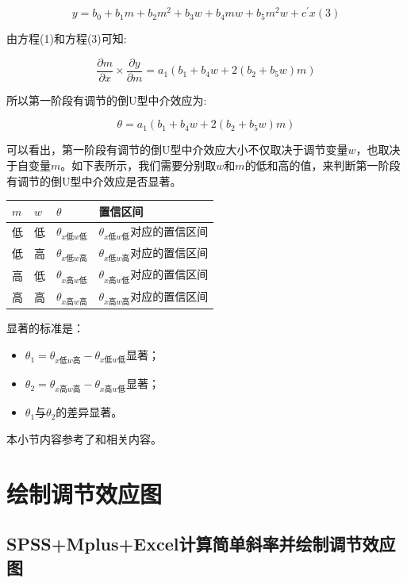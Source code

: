\documentclass[
]{book}
\begin{document}
\[
y=b_{0}+b_{1}m+b_{2}m^{2}+b_{3}w+b_{4}mw+b_{5}m^{2}w+c^{'}x(3)
\]

由方程(1)和方程(3)可知:

\[
\frac{\partial m}{\partial x}{\times}\frac{\partial y}{\partial m}=a_{1}(b_{1}+b_{4}w+2(b_{2}+b_{5}w)m)
\]

所以第一阶段有调节的倒U型中介效应为:

\[
\theta=a_{1}(b_{1}+b_{4}w+2(b_{2}+b_{5}w)m)
\]

可以看出，第一阶段有调节的倒U型中介效应大小不仅取决于调节变量\(w\)，也取决于自变量\(m\)。如下表所示，我们需要分别取\(w\)和\(m\)的低和高的值，来判断第一阶段有调节的倒U型中介效应是否显著。

\begin{longtable}[]{@{}llll@{}}
\toprule
\(m\) & \(w\) & \(\theta\) & 置信区间\tabularnewline
\midrule
\endhead
低 & 低 & \(\theta_{x低w低}\) & \(\theta_{x低w低}\)对应的置信区间\tabularnewline
低 & 高 & \(\theta_{x低w高}\) & \(\theta_{x低w高}\)对应的置信区间\tabularnewline
高 & 低 & \(\theta_{x高w低}\) & \(\theta_{x高w低}\)对应的置信区间\tabularnewline
高 & 高 & \(\theta_{x高w高}\) & \(\theta_{x高w高}\)对应的置信区间\tabularnewline
\bottomrule
\end{longtable}

显著的标准是：

\begin{itemize}
\item
  \(\theta_{1}=\theta_{x低w高}-\theta_{x低w低}\)显著；
\item
  \(\theta_{2}=\theta_{x高w高}-\theta_{x高w低}\)显著；
\item
  \(\theta_{1}\)与\(\theta_{2}\)的差异显著。
\end{itemize}

本小节内容参考了\autocite{Lin2017:RNG}和\autocite{Hu2019:RNG}相关内容。

\hypertarget{modplot}{%
\section{绘制调节效应图}\label{modplot}}

\hypertarget{spssmplusexcelux8ba1ux7b97ux7b80ux5355ux659cux7387ux5e76ux7ed8ux5236ux8c03ux8282ux6548ux5e94ux56fe}{%
\subsection{SPSS+Mplus+Excel计算简单斜率并绘制调节效应图}\label{spssmplusexcelux8ba1ux7b97ux7b80ux5355ux659cux7387ux5e76ux7ed8ux5236ux8c03ux8282ux6548ux5e94ux56fe}}
\end{document}
